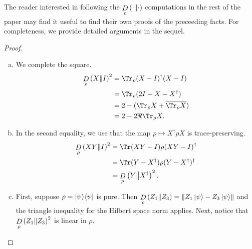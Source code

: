 The reader interested in following the $\mathop{D}\limits_{\rho}\left(\cdot\middle\| \cdot\right)$ computations in the rest of the paper may find it useful to find their own proofs of the preceeding facts. For completeness, we provide detailed arguments in the sequel.
\begin{proof}~
\begin{enumerate}[(a)]
	\item We complete the square.
	\begin{align}
		\drho{\rho}{X}{I}^2 
		&=
		\Tr_\rho(X-I)^\dagger(X-I)
		\\&= \Tr_\rho(2I - X - X^\dagger)
		\\&= 2 - (\Tr_\rho X + \bar{\Tr_\rho X})
		\\&= 2 - 2\Re\Tr_\rho X.
	\end{align}
	\item In the second equality, we use that the map $\rho \mapsto X^\dagger\rho X$ is trace-preserving.
	\begin{align}
		\drho{\rho}{XY}{I}^2
		&= \Tr (XY - I)\rho (XY - I)^\dagger
		\\&= \Tr (Y - X^\dagger)\rho (Y - X^\dagger)^\dagger
		\\&= \drho{\rho}{Y}{X^\dagger}^2.
	\end{align}
	\item First, suppose $\rho = \ket{\psi}\!\bra{\psi}$ is pure. Then $\mathop{D}\limits_{\rho}\left(Z_1\middle\| Z_3\right) = \left\Vert Z_1\ket \psi - Z_3\ket\psi\right\Vert$ and the triangle inequality for the Hilbert space norm applies. Next, notice that $\mathop{D}\limits_{\rho}\left(Z_1\middle\| Z_3\right)^2$ is linear in $\rho$. 


\end{enumerate}
\end{proof}
